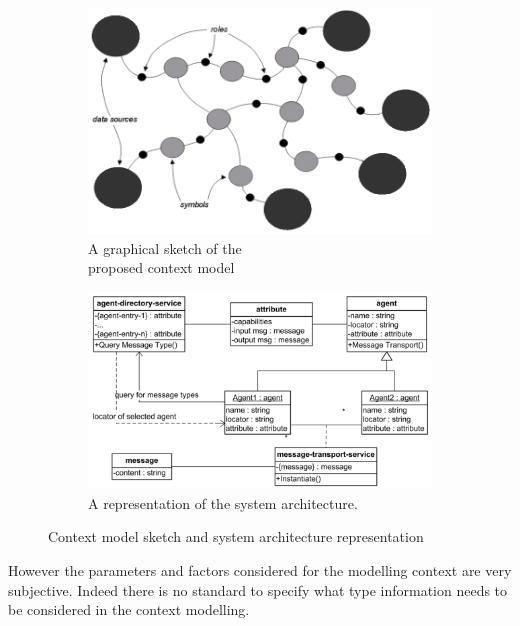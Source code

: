 \documentclass{thesisreport}
\begin{document}
 
 \begin{figure}[h]
    \centering
    \begin{subfigure}{0.47\textwidth}
        \includegraphics[width=\textwidth]{Thesis/data/ContextModelSketchh.png}
        \caption{A graphical sketch of the\\ proposed context model}
        \label{fig:sketch}
    \end{subfigure}
    \begin{subfigure}{0.47\textwidth}
        \includegraphics[width=\textwidth]{Thesis/data/architecture.png}
        \caption{A representation of the system architecture.}
        \label{fig:architecture}
    \end{subfigure}
    \caption{Context model sketch and system architecture representation}
    \label{fig:architecture-sketch}
 \end{figure}

 
 However the parameters and factors considered for the modelling context are very subjective. Indeed there is no standard to specify what type information needs to be considered in the context modelling.
 
\end{document}
